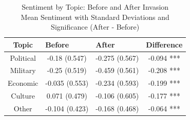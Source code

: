 \begin{table}[t]
\caption*{
{\fontsize{20}{25}\selectfont  Sentiment by Topic: Before and After Invasion\fontsize{12}{15}\selectfont } \\ 
{\fontsize{14}{17}\selectfont  Mean Sentiment with Standard Deviations and Significance (After - Before)\fontsize{12}{15}\selectfont }
} 
\fontsize{12.0pt}{14.0pt}\selectfont
\begin{tabular*}{\linewidth}{@{\extracolsep{\fill}}cllr}
\toprule
Topic & Before & After & Difference \\ 
\midrule\addlinespace[2.5pt]
Political & \multicolumn{1}{c}{{-0.18
(0.547)}} & \multicolumn{1}{c}{{-0.275
(0.567)}} & \multicolumn{1}{c}{{-0.094 ***}} \\ 
Military & \multicolumn{1}{c}{{-0.25
(0.519)}} & \multicolumn{1}{c}{{-0.459
(0.561)}} & \multicolumn{1}{c}{{-0.208 ***}} \\ 
Economic & \multicolumn{1}{c}{{-0.035
(0.553)}} & \multicolumn{1}{c}{{-0.234
(0.593)}} & \multicolumn{1}{c}{{-0.199 ***}} \\ 
Culture & \multicolumn{1}{c}{{0.071
(0.479)}} & \multicolumn{1}{c}{{-0.106
(0.605)}} & \multicolumn{1}{c}{{-0.177 ***}} \\ 
Other & \multicolumn{1}{c}{{-0.104
(0.423)}} & \multicolumn{1}{c}{{-0.168
(0.468)}} & \multicolumn{1}{c}{{-0.064 ***}} \\ 
\bottomrule
\end{tabular*}
\end{table}

